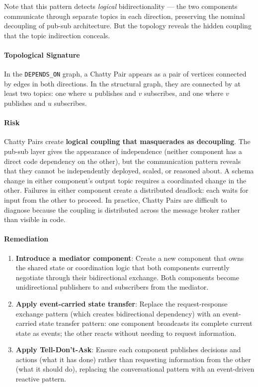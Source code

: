 \documentclass[11pt]{article}
\begin{document}
Note that this pattern detects \emph{logical} bidirectionality --- the two components communicate through separate topics in each direction, preserving the nominal decoupling of pub-sub architecture. But the topology reveals the hidden coupling that the topic indirection conceals.

\paragraph{Topological Signature}
In the \texttt{DEPENDS\_ON} graph, a Chatty Pair appears as a pair of vertices connected by edges in both directions. In the structural graph, they are connected by at least two topics: one where $u$ publishes and $v$ subscribes, and one where $v$ publishes and $u$ subscribes.

\paragraph{Risk}
Chatty Pairs create \textbf{logical coupling that masquerades as decoupling}. The pub-sub layer gives the appearance of independence (neither component has a direct code dependency on the other), but the communication pattern reveals that they cannot be independently deployed, scaled, or reasoned about. A schema change in either component's output topic requires a coordinated change in the other. Failures in either component create a distributed deadlock: each waits for input from the other to proceed. In practice, Chatty Pairs are difficult to diagnose because the coupling is distributed across the message broker rather than visible in code.

\paragraph{Remediation}
\begin{enumerate}[leftmargin=*]
\item \textbf{Introduce a mediator component}: Create a new component that owns the shared state or coordination logic that both components currently negotiate through their bidirectional exchange. Both components become unidirectional publishers to and subscribers from the mediator.
\item \textbf{Apply event-carried state transfer}: Replace the request-response exchange pattern (which creates bidirectional dependency) with an event-carried state transfer pattern: one component broadcasts its complete current state as events; the other reacts without needing to request information.
\item \textbf{Apply Tell-Don't-Ask}: Ensure each component publishes decisions and actions (what it has done) rather than requesting information from the other (what it should do), replacing the conversational pattern with an event-driven reactive pattern.
\end{enumerate}
\end{document}
